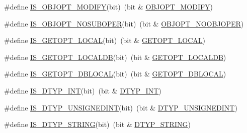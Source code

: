 \begin{DoxyCompactItemize}
\item 
\#define \hyperlink{group__LIBHELP_ga83cbd4d0e7619f1d0a70b01eee616ec9}{I\-S\-\_\-\-O\-B\-J\-O\-P\-T\-\_\-\-M\-O\-D\-I\-F\-Y}(bit)~(bit \& \hyperlink{group__LIBHELP_gga63865642181d8ac749852d657efc4bd8a946d7d6d203768b5ccb9fb64d66009f0}{O\-B\-J\-O\-P\-T\-\_\-\-M\-O\-D\-I\-F\-Y})
\item 
\#define \hyperlink{group__LIBHELP_ga135df626a9dbb769fa0413047b3fc0f5}{I\-S\-\_\-\-O\-B\-J\-O\-P\-T\-\_\-\-N\-O\-S\-U\-B\-O\-P\-E\-R}(bit)~(bit \& \hyperlink{group__LIBHELP_gga63865642181d8ac749852d657efc4bd8abadd23813b0d7abf14f8ecc76f381140}{O\-B\-J\-O\-P\-T\-\_\-\-N\-O\-O\-B\-J\-O\-P\-E\-R})
\item 
\#define \hyperlink{group__LIBHELP_ga5630a9cae5c944f69472900c13936ae8}{I\-S\-\_\-\-G\-E\-T\-O\-P\-T\-\_\-\-L\-O\-C\-A\-L}(bit)~(bit \& \hyperlink{group__LIBHELP_ggabbfae400f613b8339e81ef9427321b84a928525dbc0377081b284b65e05f0d847}{G\-E\-T\-O\-P\-T\-\_\-\-L\-O\-C\-A\-L})
\item 
\#define \hyperlink{group__LIBHELP_ga231eb259963c50b176d806aa1979eb83}{I\-S\-\_\-\-G\-E\-T\-O\-P\-T\-\_\-\-L\-O\-C\-A\-L\-D\-B}(bit)~(bit \& \hyperlink{group__LIBHELP_ggabbfae400f613b8339e81ef9427321b84a20f7a4e52b4d0ab8b1ba48fb5bf5171d}{G\-E\-T\-O\-P\-T\-\_\-\-L\-O\-C\-A\-L\-D\-B})
\item 
\#define \hyperlink{group__LIBHELP_gac2291126c4312e2496246b6e57e33dad}{I\-S\-\_\-\-G\-E\-T\-O\-P\-T\-\_\-\-D\-B\-L\-O\-C\-A\-L}(bit)~(bit \& \hyperlink{group__LIBHELP_ggabbfae400f613b8339e81ef9427321b84adce980e4fb9feed0b4747e8b3a75f122}{G\-E\-T\-O\-P\-T\-\_\-\-D\-B\-L\-O\-C\-A\-L})
\item 
\#define \hyperlink{group__LIBHELP_gaacb992147fd19097d983bd744f64a3b4}{I\-S\-\_\-\-D\-T\-Y\-P\-\_\-\-I\-N\-T}(bit)~(bit \& \hyperlink{group__LIBHELP_ggad9971b6ef33e02ba2c75d19c1d2518a1a5e2046a67c43b44453d1345083ddb0a8}{D\-T\-Y\-P\-\_\-\-I\-N\-T})
\item 
\#define \hyperlink{group__LIBHELP_ga61221cc53522daf0a70139eee879a6ff}{I\-S\-\_\-\-D\-T\-Y\-P\-\_\-\-U\-N\-S\-I\-G\-N\-E\-D\-I\-N\-T}(bit)~(bit \& \hyperlink{group__LIBHELP_ggad9971b6ef33e02ba2c75d19c1d2518a1a83acad6b2208aba94e443817f260a97d}{D\-T\-Y\-P\-\_\-\-U\-N\-S\-I\-G\-N\-E\-D\-I\-N\-T})
\item 
\#define \hyperlink{group__LIBHELP_ga0a3ed9e807a9a17ccba554e9b5e30842}{I\-S\-\_\-\-D\-T\-Y\-P\-\_\-\-S\-T\-R\-I\-N\-G}(bit)~(bit \& \hyperlink{group__LIBHELP_ggad9971b6ef33e02ba2c75d19c1d2518a1ae7f1c03f67e4477bca8c3e0b36b7022c}{D\-T\-Y\-P\-\_\-\-S\-T\-R\-I\-N\-G})
\item 

\end{DoxyCompactItemize}
